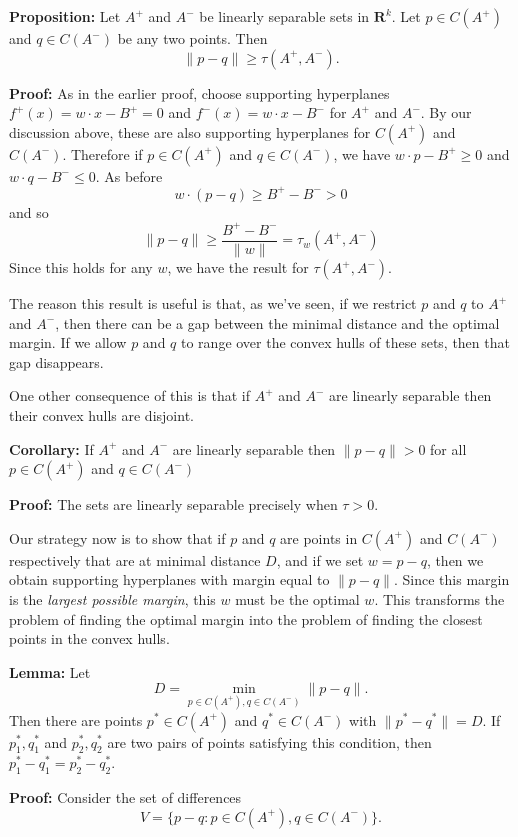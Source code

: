 \documentclass[
  11pt,
  letterpaper,
]{scrbook}
\theoremstyle{plain}
\theoremstyle{plain}
\theoremstyle{remark}
\begin{document}
\textbf{Proposition:} Let \(A^{+}\) and \(A^{-}\) be linearly separable
sets in \(\mathbf{R}^{k}\). Let \(p\in C(A^{+})\) and \(q\in C(A^{-})\)
be any two points. Then \[
\|p-q\|\ge \tau(A^{+},A^{-}).
\]

\textbf{Proof:} As in the earlier proof, choose supporting hyperplanes
\(f^{+}(x)=w\cdot x-B^{+}=0\) and \(f^{-}(x)=w\cdot x-B^{-}\) for
\(A^{+}\) and \(A^{-}\). By our discussion above, these are also
supporting hyperplanes for \(C(A^{+})\) and \(C(A^{-})\). Therefore if
\(p\in C(A^{+})\) and \(q\in C(A^{-})\), we have \(w\cdot p-B^{+}\ge 0\)
and \(w\cdot q-B^{-}\le 0\). As before \[
w\cdot(p-q)\ge B^{+}-B^{-}>0
\] and so \[
\|p-q\|\ge\frac{B^{+}-B^{-}}{\|w\|}=\tau_{w}(A^{+},A^{-})
\] Since this holds for any \(w\), we have the result for
\(\tau(A^{+},A^{-})\).

The reason this result is useful is that, as we've seen, if we restrict
\(p\) and \(q\) to \(A^{+}\) and \(A^{-}\), then there can be a gap
between the minimal distance and the optimal margin. If we allow \(p\)
and \(q\) to range over the convex hulls of these sets, then that gap
disappears.

One other consequence of this is that if \(A^{+}\) and \(A^{-}\) are
linearly separable then their convex hulls are disjoint.

\textbf{Corollary:} If \(A^{+}\) and \(A^{-}\) are linearly separable
then \(\|p-q\|>0\) for all \(p\in C(A^{+})\) and \(q\in C(A^{-})\)

\textbf{Proof:} The sets are linearly separable precisely when
\(\tau>0\).

Our strategy now is to show that if \(p\) and \(q\) are points in
\(C(A^{+})\) and \(C(A^{-})\) respectively that are at minimal distance
\(D\), and if we set \(w=p-q\), then we obtain supporting hyperplanes
with margin equal to \(\|p-q\|\). Since this margin is the \emph{largest
possible margin}, this \(w\) must be the optimal \(w\). This transforms
the problem of finding the optimal margin into the problem of finding
the closest points in the convex hulls.

\textbf{Lemma:} Let \[
D=\min_{p\in C(A^{+}),q\in C(A^{-})} \|p-q\|.
\] Then there are points \(p^*\in C(A^{+})\) and \(q^{*}\in C(A^{-})\)
with \(\|p^{*}-q^{*}\|=D\). If \(p_1^{*},q_1^{*}\) and
\(p_2^{*},q_2^{*}\) are two pairs of points satisfying this condition,
then \(p_1^{*}-q_1^{*}=p_2^{*}-q_{2}^{*}\).

\textbf{Proof:} Consider the set of differences \[
V = \{p-q: p\in C(A^{+}),q\in C(A^{-})\}.
\]
\end{document}
